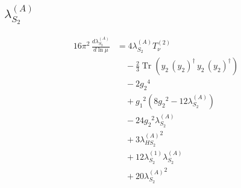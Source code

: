 \documentclass[10pt,a4paper]{article}
\begin{document}
\subsection*{$\lambda_{S_2}^{(A)}$}
\begin{align*}
16\pi^2\,\frac{d \lambda_{S_2}^{(A)}}{d\ln\mu} &=4 {\lambda_{S_2}^{(A)}} T_{\nu}^{(2)} \\
&\quad -\frac{2}{3} \operatorname{Tr}\!\left({y_2}\,\left({y_2}\right)^{\dagger}\,{y_2}\,\left({y_2}\right)^{\dagger}\right) \\
&\quad -2 {g_2}^4 \\
&\quad +{g_1}^2 \left(8 {g_2}^2-12 {\lambda_{S_2}^{(A)}}\right) \\
&\quad -24 {g_2}^2 {\lambda_{S_2}^{(A)}} \\
&\quad +3 {\lambda_{HS_2}^{(A)}}^2 \\
&\quad +12 {\lambda_{S_2}^{(1)}} {\lambda_{S_2}^{(A)}} \\
&\quad +20 {\lambda_{S_2}^{(A)}}^2 \\
\end{align*}
\end{document}
